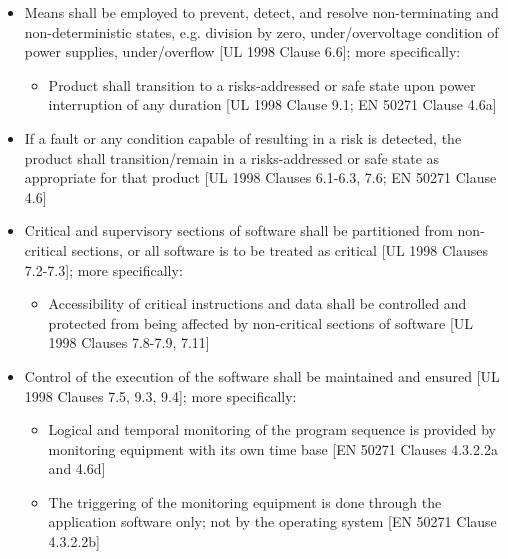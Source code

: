 \documentclass[12pt]{../Common_files/ElisaPaper}
\begin{document}
\begin{itemize}
\item Means shall be employed to prevent, detect, and resolve non-terminating and non-deterministic states, e.g. division by zero, under/overvoltage condition of power supplies, under/overflow [UL 1998 \cite{UL1998} Clause 6.6]; more specifically:

\begin{itemize}

\item Product shall transition to a risks-addressed or safe state upon power interruption of any duration [UL 1998 \cite{UL1998} Clause 9.1; EN 50271 \cite{EN50271} Clause 4.6a]

\end{itemize}

\item If a fault or any condition capable of resulting in a risk is detected, the product shall transition/remain in a risks-addressed or safe state as appropriate for that product [UL 1998 \cite{UL1998} Clauses 6.1-6.3, 7.6; EN 50271 \cite{EN50271} Clause 4.6]

\item Critical and supervisory sections of software shall be partitioned from non-critical sections, or all software is to be treated as critical [UL 1998 \cite{UL1998} Clauses 7.2-7.3]; more specifically:

\begin{itemize}

\item Accessibility of critical instructions and data shall be controlled and protected from being affected by non-critical sections of software [UL 1998 \cite{UL1998} Clauses 7.8-7.9, 7.11]

\end{itemize}

\item Control of the execution of the software shall be maintained and ensured [UL 1998 \cite{UL1998} Clauses 7.5, 9.3, 9.4]; more specifically:

\begin{itemize}

\item Logical and temporal monitoring of the program sequence is provided by monitoring equipment with its own time base [EN 50271 \cite{EN50271} Clauses 4.3.2.2a and 4.6d]

\item The triggering of the monitoring equipment is done through the application software only; not by the operating system [EN 50271 \cite{EN50271} Clause 4.3.2.2b]


\end{itemize}
\end{itemize}
\end{document}
